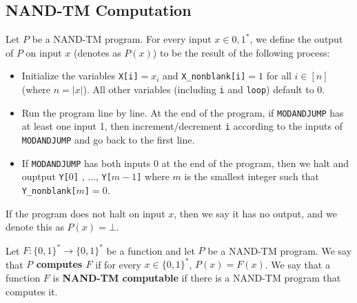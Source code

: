 \documentclass[11pt]{article}
\theoremstyle{definition}
\theoremstyle{remark}
\begin{document}
\subsection{NAND-TM Computation}
Let $P$ be a NAND-TM program. For every input $x\in {0,1}^*$, we define the output of $P$ on input $x$ (denotes as $P(x)$) to be the result of the following process:

\begin{itemize}
\item Initialize the variables \texttt{X[i]}$=x_i$ and \texttt{X\_nonblank[i]}$=1$ for all $i\in [n]$ (where $n=|x|$). All other variables (including \texttt{i} and \texttt{loop}) default to $0$.

\item Run the program line by line. At the end of the program, if \texttt{MODANDJUMP} has at least one input 1, then increment/decrement \texttt{i} according to the inputs of \texttt{MODANDJUMP} and go back to the first line.

\item If \texttt{MODANDJUMP} has both inputs 0 at the end of the program, then we halt and ouptput \texttt{Y[}$0$\texttt{]} , $\ldots$, \texttt{Y[}$m-1$\texttt{]} where $m$ is the smallest integer such that \texttt{Y\_nonblank[}$m$\texttt{]}$=0$.
\end{itemize}

If the program does not halt on input $x$, then we say it has no output, and we denote this as $P(x) = \bot$.

Let $F:\{0,1\}^* \rightarrow \{0,1\}^*$ be a function and let $P$ be a NAND-TM program. We say that \textbf{$P$ computes $F$} if for every $x\in \{0,1\}^*$, $P(x)=F(x)$. We say that a function $F$ is \textbf{NAND-TM computable} if there is a NAND-TM program that computes it.
\end{document}
